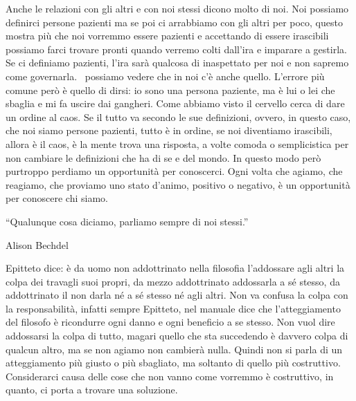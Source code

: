 \documentclass[12pt]{book} %
\begin{document}
\bigskip

Anche le relazioni con gli altri e con noi stessi dicono molto di noi. Noi possiamo definirci persone pazienti ma se poi
ci arrabbiamo con gli altri per poco, questo mostra più che noi vorremmo essere pazienti e accettando di essere
irascibili possiamo farci trovare pronti quando verremo colti dall'ira e imparare a gestirla. Se
ci definiamo pazienti, l'ira sarà qualcosa di inaspettato per noi e non sapremo come governarla.
\ possiamo vedere che in noi c'è anche quello. L'errore più comune però è quello di dirsi: io sono una persona
paziente, ma è lui o lei che sbaglia e mi fa uscire dai gangheri. Come abbiamo visto il cervello cerca di dare un
ordine al caos. Se il tutto va secondo le sue definizioni, ovvero, in questo caso, che noi siamo persone pazienti,
tutto è in ordine, se noi diventiamo irascibili, allora è il caos, è la mente trova una risposta, a volte comoda o
semplicistica per non cambiare le definizioni che ha di se e del mondo. In questo modo però purtroppo perdiamo un
opportunità per conoscerci. Ogni volta che agiamo, che reagiamo, che proviamo uno stato d'animo,
positivo o negativo, è un opportunità per conoscere chi siamo.


\bigskip

“Qualunque cosa diciamo, parliamo sempre di noi stessi.”

Alison Bechdel


\bigskip

Epitteto dice: è da uomo non addottrinato nella filosofia l'addossare agli altri la colpa dei
travagli suoi propri, da mezzo addottrinato addossarla a sé stesso, da addottrinato il non darla né a sé stesso né agli
altri. Non va confusa la colpa con la responsabilità, infatti sempre Epitteto, nel manuale dice che
l'atteggiamento del filosofo è ricondurre ogni danno e ogni beneficio a se stesso. Non vuol dire
addossarsi la colpa di tutto, magari quello che sta succedendo è davvero colpa di qualcun altro, ma se non agiamo non
cambierà nulla. Quindi non si parla di un atteggiamento più giusto o più sbagliato, ma soltanto di quello più
costruttivo. Considerarci causa delle cose che non vanno come vorremmo è costruttivo, in quanto, ci porta a trovare una
soluzione. 


\bigskip
\end{document}
